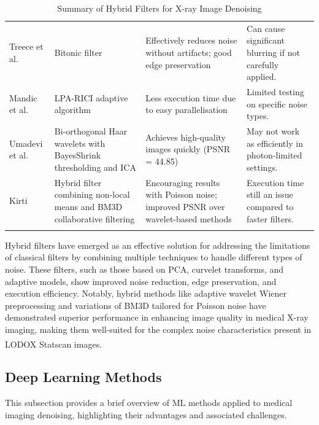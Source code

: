 \begin{center}
\begin{longtable}{ p{}  p{}  p{}  p{} }
\rowcolor[HTML]{F3F3F3} 
Treece et al. \cite{7559744} & Bitonic filter & Effectively reduces noise without artifacts; good edge preservation & Can cause significant blurring if not carefully applied. \\
\rowcolor[HTML]{FFFFFF} 
Mandic et al. \cite{mandic_denoising_2018} & \gls{LPA-RICI} adaptive algorithm & Less execution time due to easy parallelisation & Limited testing on specific noise types. \\
\rowcolor[HTML]{F3F3F3} 
Umadevi et al. \cite{umadevi_improved_2011} & Bi-orthogonal Haar wavelets with BayesShrink thresholding and \gls{ICA} & Achieves high-quality images quickly (PSNR = 44.85) & May not work as efficiently in photon-limited settings. \\
\rowcolor[HTML]{FFFFFF} 
Kirti \cite{kirti_poisson_2017} & Hybrid filter combining non-local means and \gls{BM3D} collaborative filtering & Encouraging results with Poisson noise; improved PSNR over wavelet-based methods & Execution time still an issue compared to faster filters. \\

\caption{Summary of Hybrid Filters for X-ray Image Denoising}
\label{tab:hybrid}
\end{longtable}

\end{center}


 
Hybrid filters have emerged as an effective solution for addressing the limitations of classical filters by combining multiple techniques to handle different types of noise. These filters, such as those based on \gls{PCA}, curvelet transforms, and adaptive models, show improved noise reduction, edge preservation, and execution efficiency. Notably, hybrid methods like adaptive wavelet Wiener preprocessing and variations of \gls{BM3D} tailored for Poisson noise have demonstrated superior performance in enhancing image quality in medical X-ray imaging, making them well-suited for the complex noise characteristics present in LODOX\textsuperscript{\textregistered} Statscan\textsuperscript{\textregistered} images.


\subsection{Deep Learning Methods}
\label{sec:deeplearning}
This subsection provides a brief overview of  \gls{ML} methods applied to medical imaging denoising, highlighting their advantages and associated challenges.



